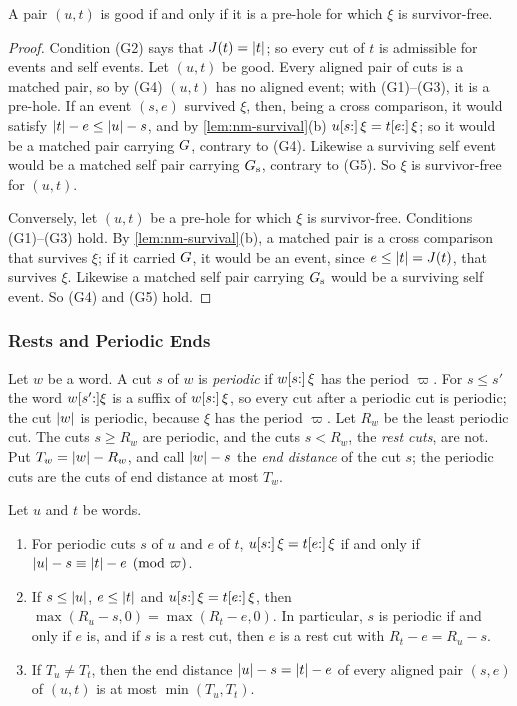 \begin{lemma}\label{lem:nm-good}
A pair $(u,t)$ is good if and only if it is a pre-hole for which $\xi$ is
survivor-free.
\end{lemma}

\begin{proof}
Condition (G2) says that $J(t)=\lvert t\rvert$; so every cut of $t$ is admissible for
events and self events. Let $(u,t)$ be good. Every aligned pair of cuts is a
matched pair, so by (G4) $(u,t)$ has no aligned event; with (G1)--(G3), it is
a pre-hole. If an event $(s,e)$ survived $\xi$, then, being a cross comparison,
it would satisfy $\lvert t\rvert-e\le\lvert u\rvert-s$, and by \cref{lem:nm-survival}(b)
$u[s{:}]\,\xi=t[e{:}]\,\xi$; so it would be a matched pair carrying $G$,
contrary to (G4). Likewise a surviving self event would be a matched self pair
carrying $G_{\mathrm{s}}$, contrary to (G5). So $\xi$ is survivor-free for $(u,t)$.

Conversely, let $(u,t)$ be a pre-hole for which $\xi$ is survivor-free.
Conditions (G1)--(G3) hold. By \cref{lem:nm-survival}(b), a matched pair is a
cross comparison that survives $\xi$; if it carried $G$, it would be an
event, since $e\le\lvert t\rvert=J(t)$, that survives $\xi$. Likewise a matched self pair
carrying $G_{\mathrm{s}}$ would be a surviving self event. So (G4) and (G5) hold.
\end{proof}

\subsubsection{Rests and Periodic Ends}

Let $w$ be a word. A cut $s$ of $w$ is \emph{periodic} if $w[s{:}]\,\xi$ has
the period $\varpi$. For $s\le s'$ the word $w[s'{:}]\xi$ is a suffix of
$w[s{:}]\,\xi$, so every cut after a periodic cut is periodic; the cut
$\lvert w\rvert$ is periodic, because $\xi$ has the period $\varpi$. Let $R_w$ be the
least periodic cut. The cuts $s\ge R_w$ are periodic, and the cuts
$s<R_w$, the \emph{rest cuts}, are not. Put $T_w=\lvert w\rvert-R_w$, and call
$\lvert w\rvert-s$ the \emph{end distance} of the cut $s$; the periodic cuts are the
cuts of end distance at most $T_w$.

\begin{lemma}\label{lem:nm-ends}
Let $u$ and $t$ be words.
\begin{enumerate}[label=(\alph*)]
\item For periodic cuts $s$ of $u$ and $e$ of $t$, $u[s{:}]\,\xi=t[e{:}]\,\xi$
if and only if $\lvert u\rvert-s\equiv\lvert t\rvert-e\pmod \varpi$.
\item If $s\le\lvert u\rvert$, $e\le\lvert t\rvert$ and $u[s{:}]\,\xi=t[e{:}]\,\xi$, then
$\max(R_u-s,0)=\max(R_t-e,0)$. In particular, $s$ is periodic if and only
if $e$ is, and if $s$ is a rest cut, then $e$ is a rest cut with
$R_t-e=R_u-s$.
\item If $T_u\ne T_t$, then the end distance $\lvert u\rvert-s=\lvert t\rvert-e$ of every aligned
pair $(s,e)$ of $(u,t)$ is at most $\min(T_u,T_t)$.
\end{enumerate}
\end{lemma}

